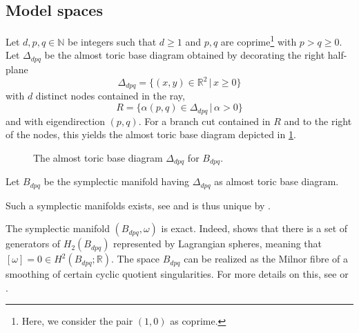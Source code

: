 \documentclass[12pt,a4paper,draft]{scrartcl}
\begin{document}
\subsection{Model spaces}
\label{sec:modelspaces}

Let $d,p,q \in \mathbb{N}$ be integers such that $d≥1$ and $p,q$ are coprime\footnote{Here, we consider the pair $(1,0)$ as coprime.} with $p>q≥0$.
Let $\Delta_{dpq}$ be the almost toric base diagram obtained by decorating the right half-plane
$$\Delta_{dpq} = \{ (x,y) \in \mathbb{R}^2 \, \vert \, x ≥ 0 \}$$
with $d$ distinct nodes contained in the ray,
\begin{equation}
  \label{eqn:eigenline}
  R = \{\alpha (p,q) \in \Delta_{dpq} \, \vert \, \alpha > 0 \}
\end{equation}
and with eigendirection $(p,q)$.
For a branch cut contained in $R$ and to the right of the nodes, this yields the almost toric base diagram depicted in \cref{fig:Bdpq_moment_image}.

\begin{figure}
\centering
{}   
\caption{The almost toric base diagram $Δ_{dpq}$ for $B_{dpq}$.}
\label{fig:Bdpq_moment_image}
\end{figure}

\begin{definition}
    \label{def:bdpq}
    Let $B_{dpq}$ be the symplectic manifold having $\Delta_{dpq}$ as almost toric base diagram.
\end{definition}

Such a symplectic manifolds exists, see \cite[Section 7.4]{evans2021atfs} and is thus unique by \cite[Theorem 8.5]{evans2021atfs}. 

\begin{remark}
    The symplectic manifold $(B_{dpq}, \omega)$ is exact.
    Indeed, \cite[Lemma 7.11]{evans2021atfs} shows that there is a set of generators of $H_2(B_{dpq})$ represented by Lagrangian spheres, meaning that $[\omega] = 0 \in H^2(B_{dpq};\mathbb{R})$.
The space $B_{dpq}$ can be realized as the Milnor fibre of a smoothing of certain cyclic quotient singularities.
For more details on this, see \cite[Section 7.4]{evans2021atfs} or \cite{Eva19}.
\end{remark}
\end{document}
